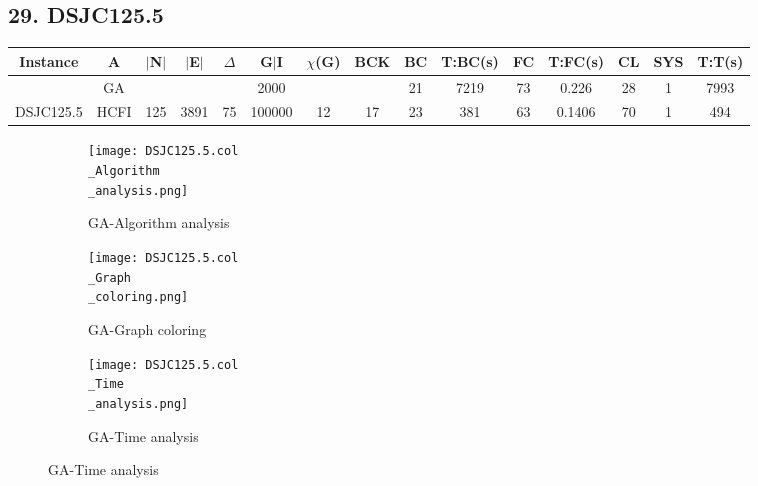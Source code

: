\documentclass[10pt]{article}
\begin{document}
\subsection*{\hspace{0,9073976cm} 29. DSJC125.5}
\begin{table}[H]
\centering
\begin{tabular}{|c|c|c|c|c|c|c|c|c|c|c|c|c|c|c|}
\hline
Instance& A &$|$N$|$ & $|$E$|$ & $\Delta$ & G$|$I & $\chi$(G) &BCK&BC & T:BC(s) & FC & T:FC(s) & CL & SYS & T:T(s) \\ \hline \hline

	&GA&       &                   &                     &     2000    &     \cellcolor{yellow} & {\cellcolor{yellow}}& {{\cellcolor{green}21}}
&7219   & 73       &0.226                   & 28                   &1          &7993        \\ \cline{2-2} \cline{6-6} \cline{9-15}
 \multirow{-2}{*}{DSJC125.5} &HCFI   &\multirow{-2}{*}{125}   &\multirow{-2}{*}{3891}     &\multirow{-2}{*}{75}     &100000     &\multirow{-2}{*}{\cellcolor{yellow}12}      & \multirow{-2}{*}{\cellcolor{yellow}17}    &{\cellcolor{green}23}     &381         &63    &0.1406         &70    & 1    &494        \\ \hline 
\end{tabular}
\end{table}
\graphicspath{{./Core1/Solutions/GA/DSJC125.5.col}}
\begin{figure}[H]
\begin{subfigure}{.33\textwidth}
  \centering
  \texttt{[image: DSJC125.5.col\\\_Algorithm\\\_analysis.png]}
  \caption{GA-Algorithm analysis}
   \label{fig:subfig1}
\end{subfigure}%
\begin{subfigure}{.33\textwidth}
  \centering
  \texttt{[image: DSJC125.5.col\\\_Graph\\\_coloring.png]}
  \caption{GA-Graph coloring}
  \label{fig:subfig2}
\end{subfigure}
\begin{subfigure}{.33\textwidth}
  \centering
  \texttt{[image: DSJC125.5.col\\\_Time\\\_analysis.png]}
  \caption{GA-Time analysis}
  \end{subfigure}
\end{figure}
\end{document}
